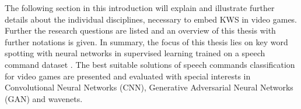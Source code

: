 The following section in this introduction will explain and illustrate further details about the individual disciplines, necessary to embed KWS in video games. 
Further the research questions are listed and an overview of this thesis with further notations is given.
In summary, the focus of this thesis lies on key word spotting with neural networks in supervised learning trained on a speech command dataset \cite{Warden2018}.
The best suitable solutions of speech commands classification for video games are presented and evaluated with special interests in Convolutional Neural Networks (CNN), Generative Adversarial Neural Networks (GAN) and wavenets.






%
%
%





